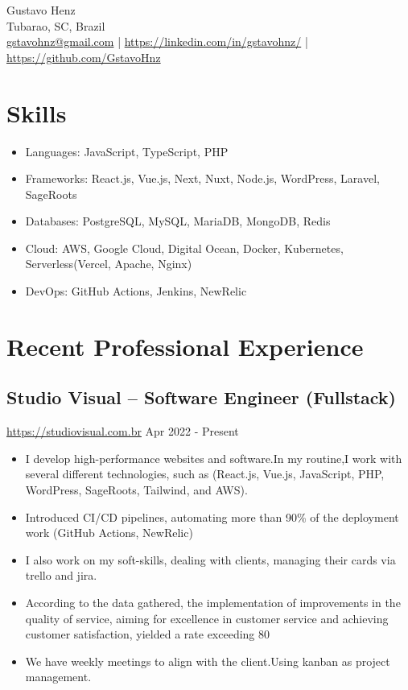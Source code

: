 \documentclass[11pt, a4paper]{article}
\begin{document}
\begin{center}
    {\Huge Gustavo Henz}\\
    \vspace{0.2cm}
    Tubarao, SC, Brazil\\
    \href{mailto:gstavohnz@gmail.com}{gstavohnz@gmail.com} | \href{https://www.linkedin.com/in/gstavohnz/}{https://linkedin.com/in/gstavohnz/} | \href{https://www.github.com/GstavoHnz}{https://github.com/GstavoHnz}
\end{center}

\section*{Skills}
\begin{itemize}[noitemsep]
    \item Languages: JavaScript, TypeScript, PHP
    \item Frameworks: React.js, Vue.js, Next, Nuxt, Node.js, WordPress, Laravel, SageRoots
    \item Databases: PostgreSQL, MySQL, MariaDB, MongoDB, Redis
    \item Cloud: AWS, Google Cloud, Digital Ocean, Docker, Kubernetes, Serverless(Vercel, Apache, Nginx)
    \item DevOps: GitHub Actions, Jenkins, NewRelic
\end{itemize}

\section*{Recent Professional Experience}
\subsection*{Studio Visual -- Software Engineer (Fullstack)}
\href{https://www.studiovisual.com.br}{https://studiovisual.com.br} \hfill Apr 2022 - Present
\begin{itemize}[noitemsep]
    \item I develop high-performance websites and software.In my routine,I work with several different technologies, such as (React.js, Vue.js, JavaScript, PHP, WordPress, SageRoots, Tailwind, and AWS).
    \item Introduced CI/CD pipelines, automating more than 90\% of the deployment work (GitHub Actions, NewRelic)
    \item I also work on my soft-skills, dealing with clients, managing their cards via trello and jira.
    \item According to the data gathered, the implementation of improvements in the quality of service, aiming for excellence in customer service and achieving customer satisfaction, yielded a rate exceeding 80%
    \item We have weekly meetings to align with the client.Using kanban as project management.
\end{itemize}
\end{document}
